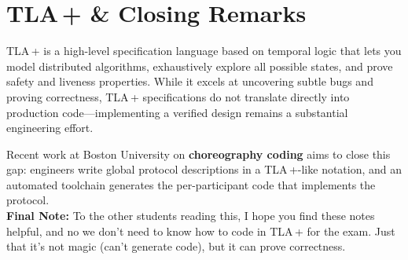 \newpage
\section{TLA\,+ \& Closing Remarks}

TLA\,+ is a high-level specification language based on temporal logic that lets you model distributed algorithms, exhaustively explore all possible states, 
and prove safety and liveness properties.  While it excels at uncovering subtle bugs and proving correctness, TLA\,+ specifications do not translate directly 
into production code---implementing a verified design remains a substantial engineering effort. 

\medskip
Recent work at Boston University on \textbf{choreography coding} aims to close this gap: engineers write global protocol descriptions in a TLA\,+-like notation, and an automated toolchain generates the per-participant code that implements the protocol.\\

\vfill
\noindent
\textbf{Final Note:} To the other students reading this, I hope you find these notes helpful, and no we don't need to know how to code in TLA\,+ for the exam. Just that it's not magic (can't generate code), but it can prove correctness.
\vfill